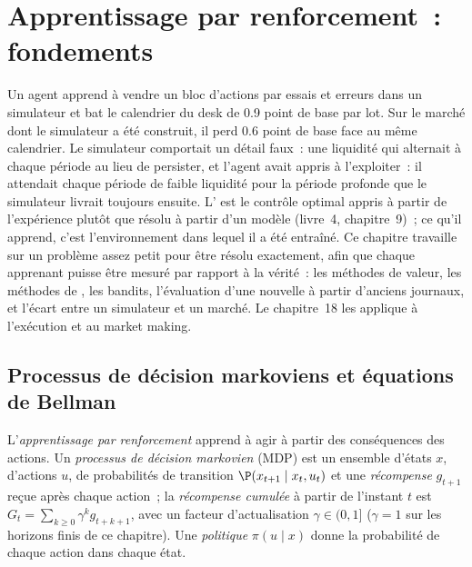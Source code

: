 \chapter{Apprentissage par renforcement~: fondements}\label{ch:ml:reinforcement-learning-foundations}

Un agent apprend à vendre un bloc d'actions par essais et erreurs dans un simulateur et bat le calendrier du desk de 0.9 point de base
par lot. Sur le marché dont le simulateur a été construit, il perd 0.6 point de base face au même calendrier. Le simulateur
comportait un détail faux~: une liquidité qui alternait à chaque période au lieu de persister, et l'agent avait appris à l'exploiter~:
il attendait chaque période de faible liquidité pour la période profonde que le simulateur livrait toujours ensuite. L' est le contrôle optimal
appris à partir de l'expérience plutôt que résolu à partir d'un modèle (livre~4, chapitre~9)~; ce qu'il apprend, c'est
l'environnement dans lequel il a été entraîné. Ce chapitre travaille sur un problème assez petit pour être résolu exactement, afin que chaque apprenant puisse être
mesuré par rapport à la vérité~: les méthodes de valeur, les méthodes de , les bandits, l'évaluation d'une nouvelle  à partir d'anciens journaux,
et l'écart entre un simulateur et un marché. Le chapitre~18 les applique à l'exécution et au market making.

\section{Processus de décision markoviens et équations de Bellman}

\begin{definition}\label{def:ml:reinforcement-learning-foundations:mdp}
L'\emph{apprentissage par renforcement} apprend à agir à partir des conséquences des actions. Un
\emph{processus de décision markovien} (MDP) est un ensemble d'états $x$, d'actions $u$, de probabilités de transition
$\P(x_{t+1}\mid x_t, u_t)$ et une \emph{récompense} $g_{t+1}$ reçue après chaque action~; la
\emph{récompense cumulée} à partir de l'instant $t$ est $G_t = \sum_{k\ge0}\gamma^kg_{t+k+1}$, avec un facteur d'actualisation
$\gamma\in(0,1]$ ($\gamma = 1$ sur les horizons finis de ce chapitre). Une \emph{politique} $\pi(u\mid x)$ donne
la probabilité de chaque action dans chaque état.
\end{definition}

